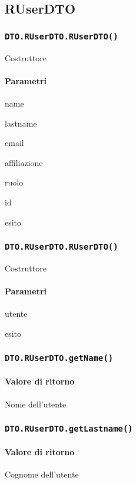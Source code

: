 \subsection{RUserDTO}
\subsubsection{\texttt{DTO.RUserDTO.RUserDTO()}}
Costruttore
\paragraph{Parametri}
\begin{description}
\item name
\item lastname
\item email
\item affiliazione
\item ruolo
\item id
\item esito
\end{description}
\subsubsection{\texttt{DTO.RUserDTO.RUserDTO()}}
Costruttore
\paragraph{Parametri}
\begin{description}
\item utente
\item esito
\end{description}
\subsubsection{\texttt{DTO.RUserDTO.getName()}}
\paragraph{Valore di ritorno}
\begin{description}
\item Nome dell'utente
\end{description}
\subsubsection{\texttt{DTO.RUserDTO.getLastname()}}
\paragraph{Valore di ritorno}
\begin{description}
\item Cognome dell'utente
\end{description}
